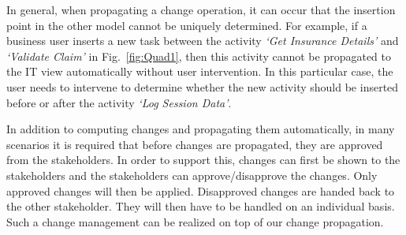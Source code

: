 In general, when propagating a change operation, it can occur that the insertion point in the other model cannot be uniquely determined. For example, if a business user inserts a new task between the activity \emph{`Get Insurance Details'} and \emph{`Validate Claim'} in Fig.~\ref{fig:Quad1}, then this activity cannot be propagated to the IT view automatically without user intervention. In this particular case, the user needs to intervene to determine whether the new activity should be inserted before or after the activity \emph{`Log Session Data'}.


In addition to computing changes and propagating them automatically, in many scenarios it is required that before changes are propagated, they are approved from the stakeholders. In order to support this, changes can first be shown to the stakeholders and the stakeholders can approve/disapprove the changes. Only approved changes will then be applied. Disapproved changes are handed back to the other stakeholder. They will then have to be handled on an individual basis. Such a change management can be realized on top of our change propagation.


